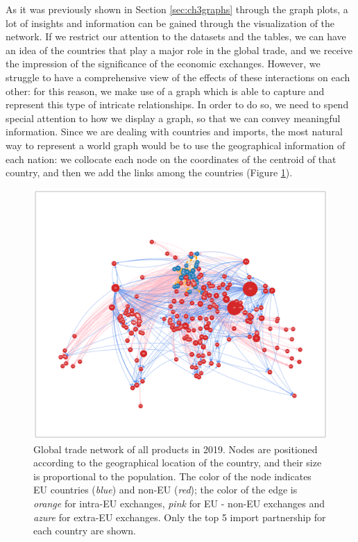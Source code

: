 As it was previously shown in Section \ref{sec:ch3graphs} through the graph plots, a lot of insights and information can be gained through the visualization of the network. If we restrict our attention to the datasets and the tables, we can have an idea of the countries that play a major role in the global trade, and we receive the impression of the significance of the economic exchanges. However, we struggle to have a comprehensive view of the effects of these interactions on each other: for this reason, we make use of a graph which is able to capture and represent this type of intricate relationships. In order to do so, we need to spend special attention to how we display a graph, so that we can convey meaningful information. Since we are dealing with countries and imports, the most natural way to represent a world graph would be to use the geographical information of each nation: we collocate each node on the coordinates of the centroid of that country, and then we add the links among the countries (Figure \ref{fig:geograph}).
\begin{figure}
    \centering
    \includegraphics[width=\textwidth]{pics/full_y19_pTO_geo.png}
    \caption[Global trade network of all products in 2019.]{Global trade network of all products in 2019. Nodes are positioned according to the geographical location of the country, and their size is proportional to the population. The color of the node indicates EU countries (\textit{blue}) and non-EU (\textit{red}); the color of the edge is \textit{orange} for intra-EU exchanges, \textit{pink} for EU - non-EU exchanges and \textit{azure} for extra-EU exchanges. Only the top 5 import partnership for each country are shown.}
    \label{fig:geograph}
\end{figure}
